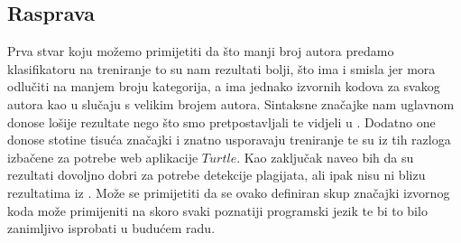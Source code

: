 \subsection{Rasprava}

Prva stvar koju možemo primijetiti da što manji broj autora predamo klasifikatoru na treniranje to su nam rezultati bolji, što ima i smisla jer mora odlučiti na manjem broju kategorija, a ima jednako izvornih kodova za svakog autora kao u slučaju s velikim brojem autora. Sintaksne značajke nam uglavnom donose lošije rezultate nego što smo pretpostavljali te vidjeli u \cite{islam}. Dodatno one donose stotine tisuća značajki i znatno usporavaju treniranje te su iz tih razloga izbačene za potrebe web aplikacije $Turtle$. Kao zaključak naveo bih da su rezultati dovoljno dobri za potrebe detekcije plagijata, ali ipak nisu ni blizu rezultatima iz \cite{islam}. Može se primijetiti da se ovako definiran skup značajki izvornog koda može primijeniti na skoro svaki poznatiji programski jezik te bi to bilo zanimljivo isprobati u budućem radu.